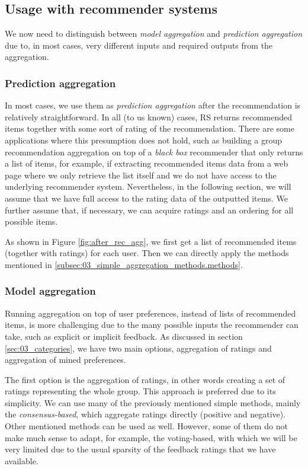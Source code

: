 \subsection{Usage with recommender systems}
We now need to distinguish between \textit{model aggregation} and \textit{prediction aggregation} due to, in most cases, very different inputs and required outputs from the aggregation.
\subsubsection{Prediction aggregation}
In most cases, we use them as \textit{prediction aggregation} after the recommendation is relatively straightforward. In all (to us known) cases, RS returns recommended items together with some sort of rating of the recommendation. There are some applications where this presumption does not hold, such as building a group recommendation aggregation on top of a \textit{black box} recommender that only returns a list of items, for example, if extracting recommended items data from a web page where we only retrieve the list itself and we do not have access to the underlying recommender system. Nevertheless, in the following section, we will assume that we have full access to the rating data of the outputted items. We further assume that, if necessary, we can acquire ratings and an ordering for all possible items.

As shown in Figure \ref{fig:after_rec_agg}, we first get a list of recommended items (together with ratings) for each user. Then we can directly apply the methods mentioned in \ref{subsec:03_simple_aggregation_methods.methods}.

\subsubsection{Model aggregation}
Running aggregation on top of user preferences, instead of lists of recommended items, is more challenging due to the many possible inputs the recommender can take, such as explicit or implicit feedback. As discussed in section \ref{sec:03_categories}, we have two main options, aggregation of ratings and aggregation of mined preferences.

The first option is the aggregation of ratings, in other words creating a set of ratings representing the whole group. This approach is preferred due to its simplicity. We can use many of the previously mentioned simple methods, mainly the \textit{consensus-based}, which aggregate ratings directly (positive and negative). Other mentioned methods can be used as well. However, some of them do not make much sense to adapt, for example, the voting-based, with which we will be very limited due to the usual sparsity of the feedback ratings that we have available.

